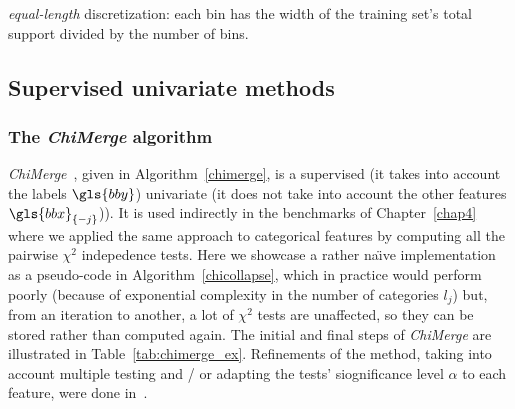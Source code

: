 \begin{algorithm}[H]
 \KwResult{$\hat{\q}$}
 \For{$j=1$ to $d$}{
Let $w_j = \max_{i} x_{i,j} - \min_{i} x_{i,j}$\;
Let $c_0=-\infty$, $c_{m_j} = + \infty$ and $c_{j,h} = \frac{w_j \cdot h}{m_j} + \min_{i} x_{i,j}$\;
Let $C_{j,h} = ]c_{j,h-1};c_{j,h}]$ and $\hat{\q}_j(\cdot) = (\hat{q}_{j,h}(\cdot))_1^{m_j}$\;
Set $\hat{q}_{j,h}(\cdot)=\mathds{1}_{C_{j,h}}(\cdot)$.
}
 \caption{\label{equal-length-disc} \textit{equal-length} discretization: each bin has the width of the training set's total support divided by the number of bins.}
\end{algorithm}



\subsection{Supervised univariate methods}

\subsubsection{The \textit{ChiMerge} algorithm}

\textit{ChiMerge}~\cite{kerber1992chimerge}, given in Algorithm~\ref{chimerge}, is a supervised (it takes into account the labels $\gls{bby}$) univariate (it does not take into account the other features $\gls{bbx}_{\{-j\}}$)). It is used indirectly in the benchmarks of Chapter~\ref{chap4} where we applied the same approach to categorical features by computing all the pairwise $\chi^2$ indepedence tests. Here we showcase a rather na\"{\i}ve implementation as a pseudo-code in Algorithm~\ref{chicollapse}, which in practice would perform poorly (because of exponential complexity in the number of categories $l_j$) but, from an iteration to another, a lot of $\chi^2$ tests are unaffected, so they can be stored rather than computed again. The initial and final steps of \textit{ChiMerge} are illustrated in Table~\ref{tab:chimerge_ex}. Refinements of the method, taking into account multiple testing and / or adapting the tests' siognificance level $\alpha$ to each feature, were done in~\cite{liu1995chi2,wang1998concurrent,tay2002modified,su2005extended}.

